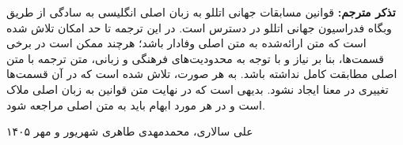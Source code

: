 
\textbf{تذکر مترجم:} قوانین مسابقات جهانی اتللو به زبان اصلی انگلیسی به سادگی از طریق وبگاه فدراسیون جهانی اتللو در دسترس است. در این ترجمه تا حد امکان تلاش شده است که متن ارائه‌شده به متن اصلی وفادار باشد؛ هرچند ممکن است در برخی قسمت‌ها، بنا بر نیاز و با توجه به محدودیت‌های فرهنگی و زبانی، متن ترجمه با متن اصلی مطابقت کامل نداشته باشد. به هر صورت، تلاش شده است که در آن قسمت‌ها تغییری در معنا ایجاد نشود. بدیهی است که در نهایت متن قوانین به زبان اصلی ملاک است و در هر مورد ابهام باید به متن اصلی مراجعه شود.

\begin{emza}
علی سالاری، محمدمهدی طاهری \lr{--} شهریور و مهر ۱۴۰۵
\end{emza}
